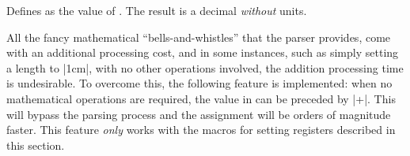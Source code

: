 \begin{command}{\pgfmathsetmacro{}}
	Defines  as the  value of . The result
	is a decimal \emph{without} units.
\end{command}

All the fancy mathematical ``bells-and-whistles'' that the parser 
provides, come with an additional processing cost, and in some
instances, such as simply setting a length to |1cm|, with no other
operations involved, the addition processing time is undesirable. 
To overcome this, the following feature is implemented: when no
mathematical operations are required, the value in 
can be preceded by |+|. This will bypass the parsing process and the 
assignment will be orders of magnitude faster. This feature 
\emph{only} works with the macros for setting registers described in
this section.

\begin{codeexample}
\pgfmathsetlength\mydimen{1cm}  %
\pgfmathsetlength\mydimen{+1cm} %
\end{codeexample}







